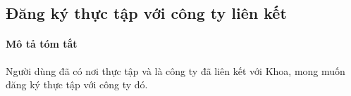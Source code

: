 \documentclass[./../main.tex]{subfiles}
\begin{document}
  
  
  
  









\subsection{Đăng ký thực tập với công ty liên kết}

\paragraph*{Mô tả tóm tắt}

Người dùng đã có nơi thực tập và là công ty đã liên kết với Khoa, mong
muốn đăng ký thực tập với công ty đó.
\end{document}
